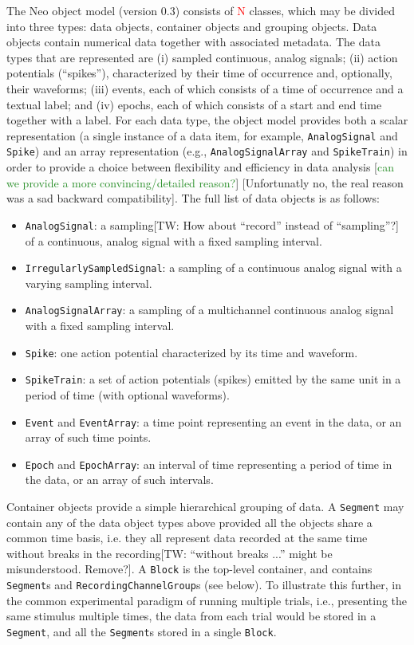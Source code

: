\documentclass{frontiers}
\newcommand{\missing}[1]{\textcolor{red}{#1}}
\newcommand{\andrew}[1]{[\textcolor{ForestGreen}{#1}]}
\newcommand{\samuel}[1]{[\textcolor{RubineRed}{#1}]}
\newcommand{\thomas}[1]{[\textcolor{Emerald}{TW: #1}]}
\begin{document}
The Neo object model (version 0.3) consists of \missing{N} classes, which may be divided into three types: data objects, container objects and grouping objects.
Data objects contain numerical data together with associated metadata.
The data types that are represented are 
(i) sampled continuous, analog signals; 
(ii) action potentials (``spikes''), characterized by their time of occurrence and, optionally, their waveforms; 
(iii) events, each of which consists of a time of occurrence and a textual label; and 
(iv) epochs, each of which consists of a start and end time together with a label.
For each data type, the object model provides both a scalar representation (a single instance of a data item, for example, \lstinline`AnalogSignal` and \lstinline`Spike`) and an array representation (e.g., \lstinline`AnalogSignalArray` and \lstinline`SpikeTrain`) in order to provide a choice between flexibility and efficiency in data analysis \andrew{can we provide a more convincing/detailed reason?} \samuel{Unfortunatly no, the real reason was a sad backward compatibility}.
The full list of data objects is as follows:

\begin{itemize}
\item \lstinline`AnalogSignal`: a sampling\thomas{How about ``record'' instead of ``sampling''?} of a continuous, analog signal with a fixed sampling interval.
\item \lstinline`IrregularlySampledSignal`: a sampling of a continuous analog signal with a varying sampling interval.
\item \lstinline`AnalogSignalArray`: a sampling of a multichannel continuous analog signal with a fixed sampling interval.
\item \lstinline`Spike`: one action potential characterized by its time and waveform.
\item \lstinline`SpikeTrain`: a set of action potentials (spikes) emitted by the same unit in a period of time (with optional waveforms).
\item \lstinline`Event` and \lstinline`EventArray`: a time point representing an event in the data, or an array of such time points.
\item \lstinline`Epoch` and \lstinline`EpochArray`: an interval of time representing a period of time in the data, or an array of such intervals.
\end{itemize}

Container objects provide a simple hierarchical grouping of data. 
A \lstinline`Segment` may contain any of the data object types above provided all the objects share a common time basis, i.e. they all represent data recorded at the same time without breaks in the recording\thomas{``without breaks ...'' might be misunderstood. Remove?}. 
A \lstinline`Block` is the top-level container, and contains \lstinline`Segment`s and \lstinline`RecordingChannelGroup`s (see below).
To illustrate this further, in the common experimental paradigm of running multiple trials, i.e., presenting the same stimulus multiple times, the data from each trial would be stored in a \lstinline`Segment`, and all the \lstinline`Segment`s stored in a single \lstinline`Block`. 
\end{document}
